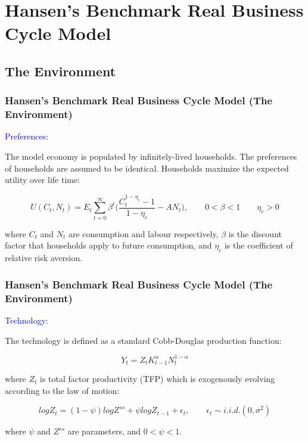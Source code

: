 \documentclass[handout]{beamer}
\begin{document}
\section{Hansen's Benchmark Real Business Cycle Model}

\subsection{The Environment}

\begin{frame}

\frametitle{Hansen's Benchmark Real Business Cycle Model (The
Environment)} \vskip 0.1in

\textcolor{blue}{Preferences:}

The model economy is populated by infinitely-lived households. The
preferences of households are assumed to be identical. Households
maximize the expected utility over life time:

\begin{equation}\label{Eq3.1}
U(C_t,N_t)=E_{t}\sum_{t=0}^\infty\beta^t\biggl(\frac{C_t^{1-\eta_{c}}-1}{1-\eta_{c}}-AN_t\biggr),\qquad
0<\beta<1\qquad \eta_{c}>0
\end{equation}

where $C_t$ and $N_t$ are consumption and labour respectively,
$\beta$ is the discount factor that households apply to future
consumption, and $\eta_{c}$ is the coefficient of relative risk
aversion.\\\vskip 0.1in


\end{frame}

\begin{frame}

\frametitle{Hansen's Benchmark Real Business Cycle Model (The
Environment)} \vskip 0.1in

\textcolor{blue}{Technology:}

The technology is defined as a standard Cobb-Douglas production
function:

\begin{equation}\label{Eq3.2}
Y_t=Z_tK_{t-1}^{\alpha}N_t^{1-\alpha}
\end{equation}

where $Z_t$ is total factor productivity (TFP) which is exogenously
evolving according to the law of motion:

\begin{equation}\label{Eq3.3}
logZ_t=(1-\psi)logZ^{ss} + \psi logZ_{t-1}+\epsilon_t, \qquad
\epsilon_t\sim i.i.d.(0,\sigma^2)
\end{equation}

\noindent where $\psi$ and $Z^{ss}$ are parameters, and
$0<\psi<1$.\smallskip
\end{frame}
\end{document}
